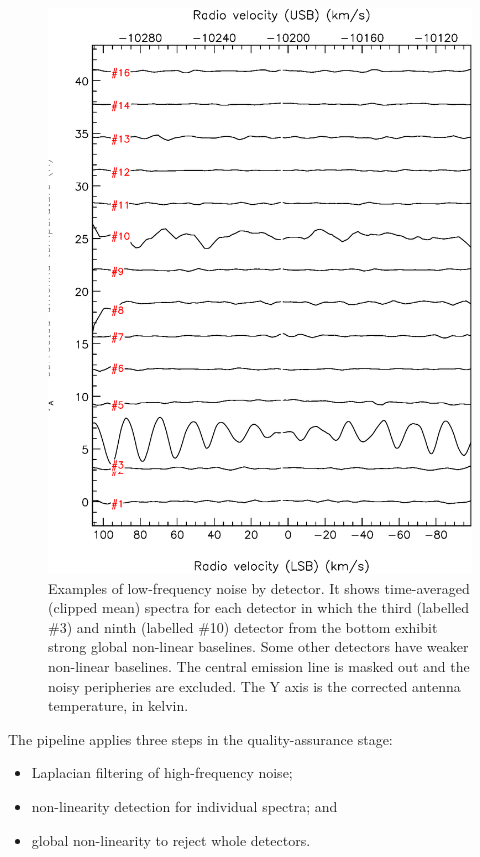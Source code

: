 \documentclass[useAMS,usenatbib]{mn2e}
\begin{document}
\begin{figure}
\includegraphics[width=\columnwidth]{receptors_nonlinearity}
\caption{Examples of low-frequency noise by detector.
  It shows time-averaged (clipped mean) spectra for each detector in
  which the third (labelled \#3) and ninth (labelled \#10) detector from the bottom
  exhibit strong global non-linear baselines.  Some other detectors
  have weaker non-linear baselines.  The central emission line
  is masked out and the noisy peripheries are excluded. The Y axis is
  the corrected  antenna temperature, in kelvin.}
\label{fig:badbase:interference_receptors}
\end{figure}

The pipeline applies three steps in the quality-assurance stage:
\begin{itemize}
\item Laplacian filtering of high-frequency noise;
\item non-linearity detection for individual spectra; and
\item global non-linearity to reject whole detectors.
\end{itemize}
\end{document}
